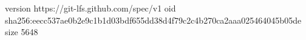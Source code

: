 version https://git-lfs.github.com/spec/v1
oid sha256:eecc537ae0b2e9c1b1d03bdf655dd38d4f79c2c4b270ca2aaa025464045b05de
size 5648
